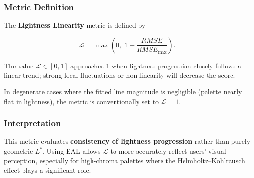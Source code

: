 \subsubsection{Metric Definition}

The \textbf{Lightness Linearity} metric is defined by

\[
\mathcal{L} =
\max\!\left(
0,\;
1 - \frac{RMSE}{RMSE_{\max}}
\right).
\]

The value $\mathcal{L} \in [0,1]$ approaches 1 when lightness progression
closely follows a linear trend; strong local fluctuations or
non-linearity will decrease the score.

In degenerate cases where the fitted line magnitude is negligible
(palette nearly flat in lightness), the metric is conventionally set to
$\mathcal{L} = 1$.

\subsubsection{Interpretation}

This metric evaluates \textbf{consistency of lightness progression}
rather than purely geometric $L^*$. Using EAL allows $\mathcal{L}$ to
more accurately reflect users' visual perception, especially for
high-chroma palettes where the Helmholtz--Kohlrausch effect plays a
significant role.
